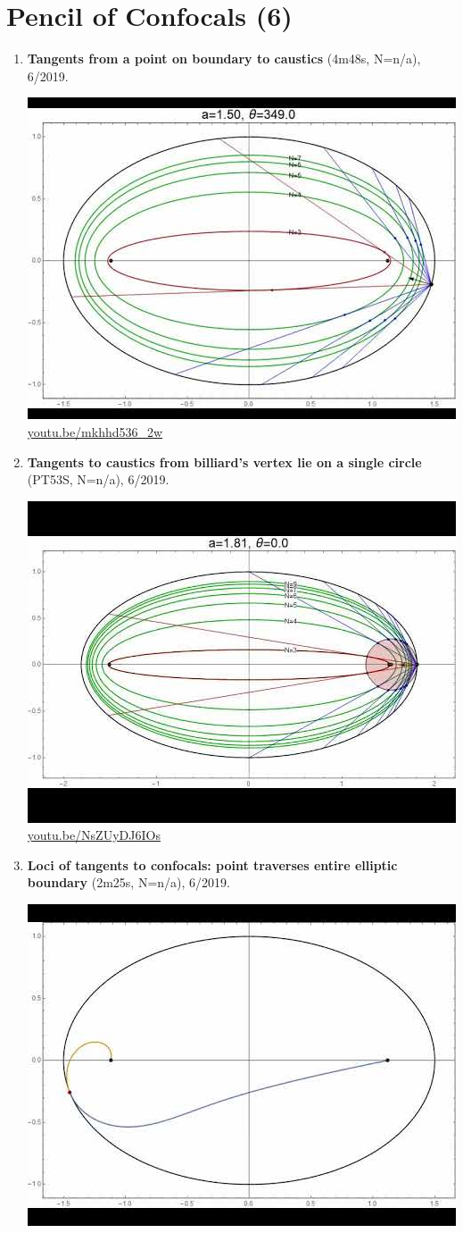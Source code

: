\documentclass[12pt]{amsart}
\begin{document}
\section{Pencil of Confocals (6)}

\begin{enumerate}[resume]
\item \textbf{Tangents from a point on boundary to caustics} (4m48s, N=n/a), 6/2019. 
\begin{center}\includegraphics[width=.5\textwidth]{pics/mkhhd536_2w.jpg} \\ 
\href{https://youtu.be/mkhhd536_2w}{\url{youtu.be/mkhhd536\_2w}}\end{center}
% 
\item \textbf{Tangents to caustics from billiard's vertex lie on a single circle} (PT53S, N=n/a), 6/2019. 
\begin{center}\includegraphics[width=.5\textwidth]{pics/NsZUyDJ6IOs.jpg} \\ 
\href{https://youtu.be/NsZUyDJ6IOs}{\url{youtu.be/NsZUyDJ6IOs}}\end{center}
% 
\item \textbf{Loci of tangents to confocals: point traverses entire elliptic boundary} (2m25s, N=n/a), 6/2019. 
\begin{center}\includegraphics[width=.5\textwidth]{pics/EL4vgcJaktc.jpg} \\ 

\end{center}
\end{enumerate}
\end{document}

